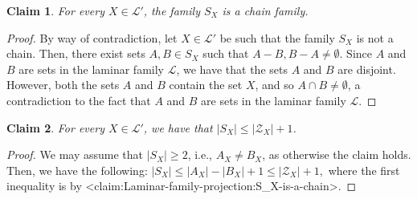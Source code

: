 \documentclass{article}
\def\Cref#1{<#1>}%
\newtheorem{claim}{Claim}[section]
\providecommand{\calL}{\mathcal{L}}
\providecommand{\calZ}{\mathcal{Z}}
\begin{document}
\begin{claim}\label{claim:Laminar-family-projection:S_X-is-a-chain}
        For every $X \in\calL'$, the family $S_X$ is a chain family.
    \end{claim}
    \begin{proof}
        By way of contradiction, let $X \in \calL'$ be such that the family $S_X$ is not a chain. Then, there exist sets $A, B \in S_X$ such that $A - B, B - A \not = \emptyset$. Since $A$ and $B$ are sets in the laminar family $\calL$, we have that the sets $A$ and $B$ are disjoint. However, both the sets $A$ and $B$ contain the set $X$, and so $A\cap B \not = \emptyset$, a contradiction to the fact that $A$ and $B$ are sets in the laminar family $\calL$.
    \end{proof}

\begin{claim}\label{claim:Laminar-family-projection:|S_X|-atmost-|Z_X|+1}
    For every $X \in \calL'$, we have that $|S_X| \leq |\calZ_{X}| + 1$.
\end{claim}
\begin{proof}
    We may assume that $|S_X| \geq 2$, i.e.,  $A_X \not = B_X$, as otherwise the claim holds. Then, we have the following:
    $|S_X| \leq |A_X| - |B_X| + 1 \leq |\calZ_X| +1,$ where the first inequality is by \Cref{claim:Laminar-family-projection:S_X-is-a-chain}.
\end{proof}
\end{document}

